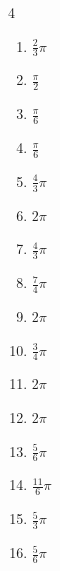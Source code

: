 \begin{multicols}{4}
\begin{enumerate}
  \item $\displaystyle \frac{2}{3}\pi$

  \item $\displaystyle \frac{\pi}{2}$

\columnbreak %

  \item $\displaystyle \frac{\pi}{6}$

  \item $\displaystyle \frac{\pi}{6}$

  \item $\displaystyle \frac{4}{3}\pi$

  \item $\displaystyle 2\pi$

  \item $\displaystyle \frac{4}{3}\pi$

  \item $\displaystyle \frac{7}{4}\pi$

  \item $\displaystyle 2\pi$

  \item $\displaystyle \frac{3}{4}\pi$

  \item $\displaystyle 2\pi$

  \item $\displaystyle 2\pi$

  \item $\displaystyle \frac{5}{6}\pi$

  \item $\displaystyle \frac{11}{6}\pi$

  \item $\displaystyle \frac{5}{3}\pi$

  \item $\displaystyle \frac{5}{6}\pi$


\end{enumerate}
\end{multicols}
